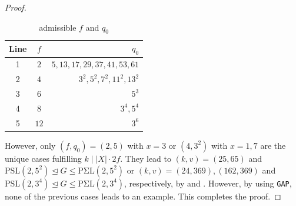 \documentclass[a4paper,twopage,reqno,12pt]{amsart}
\theoremstyle{definition}
\numberwithin{equation}{section}
\newcommand{\PSL}{\mathrm{PSL}}
\newcommand{\PSigL}{\mathrm{P\Sigma L}}
\renewcommand{\leq}{\leqslant}
\begin{document}
\begin{proof}
\begin{table}[H]
\centering 
\caption{admissible $f$ and $q_0$} 
\label{tab:C2} 
\begin{tabular}{ccr}
\toprule
Line & $f$ & $q_0$ \\ 
\midrule 
1&  $2$&  $5,13,17,29,37,41,53,61$ \\
2&  $4$ & $3^{2},5^{2},7^{2},11^{2},13^{2}$ \\
3 & $6$ & $5^{3}$ \\
4 & $8$ & $3^{4},5^{4}$ \\
5 & $12$ & $3^{6}$\\
\bottomrule 
\end{tabular}
\end{table}
However, only $(f,q_0)=(2,5)$ with $x=3$ or $(4,3^{2})$ with $x=1,7$ are the unique cases fulfilling $k \mid \left\vert X \right\vert \cdot 2f$. They lead to $(k,v)=(25,65)$ and $\PSL(2,5^{2})\unlhd G\leq \PSigL(2,5^{2})$ or $(k,v)=(24,369),(162,369)$ and $\PSL(2,3^{4})\unlhd G\leq \PSigL(2,3^{4})$, respectively, by \cite[§260]{Di} and \cite[Theorem 1.3(5)]{gmaxi}. However, by using \texttt{GAP}, none of the previous cases leads to an example. This completes the proof.
\end{proof}
\end{document}
